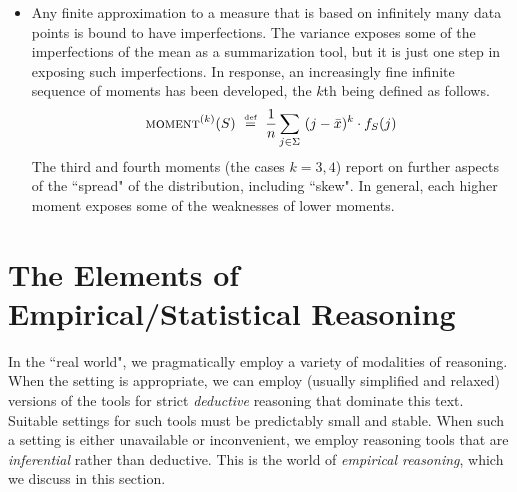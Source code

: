 \begin{itemize}
\item
Any finite approximation to a measure that is based on infinitely many data points is bound to have imperfections.  The variance exposes some of the imperfections of the mean as a summarization tool, but it is just one step in exposing such imperfections.  In response, an increasingly fine infinite sequence of moments has been developed, the $k$th being defined as follows.
\[
\mbox{\sc moment}^{(k)}(S) \ \stackrel{\mbox{{\tiny def}}}{=} \ {1 \over n} \sum_{j \in \Sigma} \ (j - \bar{x})^k \cdot f_S(j)
\]
The third and fourth moments (the cases $k = 3,4$) report on further aspects of the ``spread" of the distribution, including ``skew".  In general, each higher moment exposes some of the weaknesses of lower moments.
\end{itemize}


\section{The Elements of Empirical/Statistical Reasoning}
\label{sec:empirical}

In the ``real world", we pragmatically employ a variety of modalities of reasoning.  When the setting is appropriate, we can employ (usually simplified and relaxed) versions of the tools for strict {\em deductive} reasoning that dominate this text.  Suitable settings for such tools must be predictably small and stable.  When such a setting is either unavailable or inconvenient, we employ reasoning tools that are {\em inferential} rather than deductive.  This is the world of {\em empirical reasoning}, which we discuss in this section.

